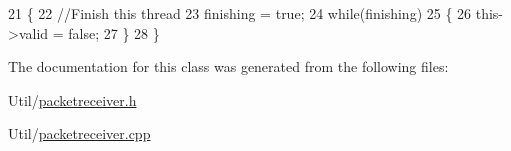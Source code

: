 \begin{DoxyCode}
21 \{
22     \textcolor{comment}{//Finish this thread}
23     finishing = \textcolor{keyword}{true};
24     \textcolor{keywordflow}{while}(finishing)
25     \{
26         this->valid = \textcolor{keyword}{false};
27     \}
28 \}
\end{DoxyCode}


The documentation for this class was generated from the following files\-:\begin{DoxyCompactItemize}
\item 
Util/\hyperlink{packetreceiver_8h}{packetreceiver.\-h}\item 
Util/\hyperlink{packetreceiver_8cpp}{packetreceiver.\-cpp}\end{DoxyCompactItemize}
